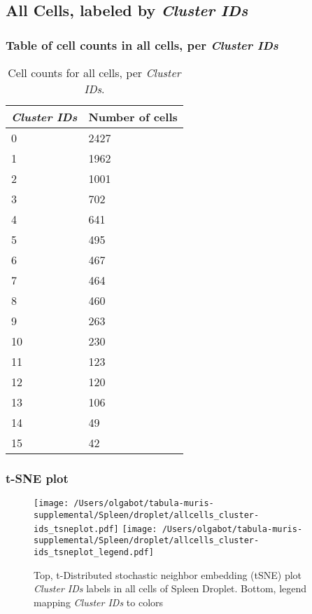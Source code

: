 \clearpage

\subsection{All Cells, labeled by \emph{Cluster IDs}}
\subsubsection{Table of cell counts in all cells, per \emph{Cluster IDs}}\begin{table}[h]
\centering
\label{my-label}
\begin{tabular}{@{}ll@{}}
\toprule

\emph{Cluster IDs}& Number of cells \\ \midrule
0 & 2427 \\

1 & 1962 \\

2 & 1001 \\

3 & 702 \\

4 & 641 \\

5 & 495 \\

6 & 467 \\

7 & 464 \\

8 & 460 \\

9 & 263 \\

10 & 230 \\

11 & 123 \\

12 & 120 \\

13 & 106 \\

14 & 49 \\

15 & 42 \\
\bottomrule
\end{tabular}
\caption{Cell counts for all cells, per \emph{Cluster IDs}.}
\end{table}

\clearpage
\subsubsection{t-SNE plot}
\begin{figure}[h]
\centering
\texttt{[image: /Users/olgabot/tabula-muris-supplemental/Spleen/droplet/allcells\_cluster-ids\_tsneplot.pdf]}
\texttt{[image: /Users/olgabot/tabula-muris-supplemental/Spleen/droplet/allcells\_cluster-ids\_tsneplot\_legend.pdf]}
\caption{Top, t-Distributed stochastic neighbor embedding (tSNE) plot  \emph{Cluster IDs} labels in all cells of Spleen Droplet. Bottom, legend mapping \emph{Cluster IDs} to colors}
\end{figure}



